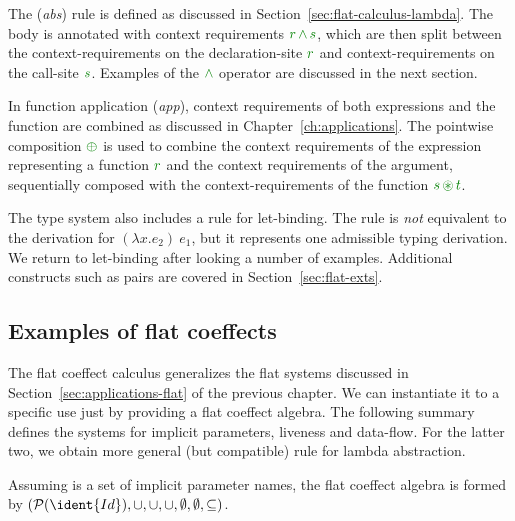 The (\emph{abs}) rule is defined as discussed in Section~\ref{sec:flat-calculus-lambda}. The
body is annotated with context requirements $\cclrd{r} \,\czip\, \cclrd{s}$, which are then split
between the context-requirements on the declaration-site $\cclrd{r}$ and context-requirements on
the call-site $\cclrd{s}$. Examples of the $\czip$ operator are discussed in the next section.

In function application (\emph{app}), context requirements of both expressions and the 
function are combined as discussed in Chapter~\ref{ch:applications}. The pointwise composition
$\cpar$ is used to combine the context requirements of the expression representing a function 
$\cclrd{r}$ and the context requirements of the argument, sequentially composed with the 
context-requirements of the function $\cclrd{s}\, \cseq \,\cclrd{t}$.

The type system also includes a rule for let-binding. The rule is \emph{not} equivalent to the
derivation for $(\lambda x.e_2)~e_1$, but it represents one admissible typing derivation. We
return to let-binding after looking a number of examples. Additional constructs such 
as pairs are covered in Section~\ref{sec:flat-exts}.


\subsection{Examples of flat coeffects}

The flat coeffect calculus generalizes the flat systems discussed in 
Section~\ref{sec:applications-flat} of the previous chapter. We can instantiate it to a specific
use just by providing a flat coeffect algebra. The following summary defines the systems for implicit 
parameters, liveness and data-flow. For the latter two, we obtain more general (but compatible) rule 
for lambda abstraction.

\begin{example}
Assuming  is a set of implicit parameter names, the flat coeffect algebra 
is formed by $(\mathcal{P}(\ident{Id}), \cup, \cup, \cup, \emptyset, \emptyset, \subseteq)$.
\end{example}

